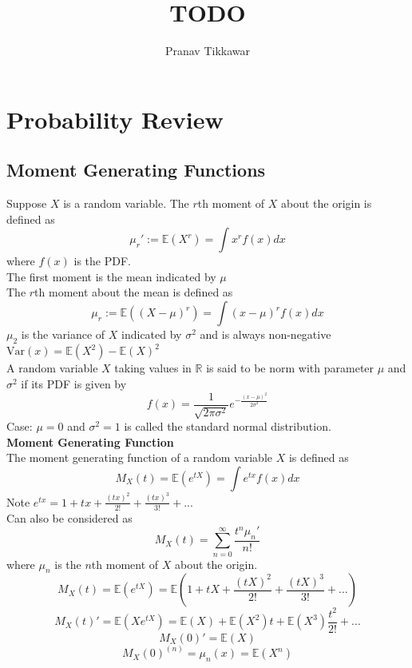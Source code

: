 \documentclass{article}
\author{Pranav Tikkawar}
\title{TODO}
\newcommand{\expec}[1]{\mathds{E}(#1)}
\newcommand{\var}[1]{\text{Var}(#1)}
\begin{document}
\maketitle

\section{Probability Review}
\subsection*{Moment Generating Functions}
Suppose $X$ is a random variable. The $r$th moment of $X$ about the origin is defined as
$$\mu_r' := \expec{X^r} = \int x^r f(x) dx$$
where $f(x)$ is the PDF. \\
The first moment is the mean indicated by $\mu$ \\
The $r$th moment about the mean is defined as
$$ \mu_r := \expec{(X - \mu)^r} = \int (x - \mu)^r f(x) dx$$
$\mu_2$ is the variance of $X$ indicated by $\sigma^2$ and is always non-negative \\
$\var{x} = \expec{X^2} - \expec{X}^2$ \\
A random variable $X$ taking values in $\mathds{R}$ is said to be norm with parameter $\mu$ and $\sigma^2$ if its PDF is given by
$$f(x) = \frac{1}{\sqrt{2\pi \sigma^2}} e^{-\frac{(x - \mu)^2}{2\sigma^2}}$$
Case: $\mu = 0$ and $\sigma^2 = 1$ is called the standard normal distribution. \\
\textbf{Moment Generating Function} \\
The moment generating function of a random variable $X$ is defined as 
$$M_X(t) = \expec{e^{tX}} = \int e^{tx} f(x)dx $$
Note $e^{tx} = 1 + tx + \frac{(tx)^2}{2!} + \frac{(tx)^3}{3!} + ...$ \\
Can also be considered as 
$$ M_X(t) = \sum_{n=0}^{\infty} \frac{t^n \mu_n'}{n!}$$
where $\mu_n$ is the $n$th moment of $X$ about the origin. \\
$$M_X(t) = \expec{e^{tX}} = \expec{1 + tX + \frac{(tX)^2}{2!} + \frac{(tX)^3}{3!} + ...}$$
$$M_X(t)' = \expec{Xe^{tX}} = \expec{X} + \expec{X^2}t + \expec{X^3}\frac{t^2}{2!} + ...$$
$$M_X(0)' = \expec{X} $$
$$M_X(0)^{(n)} = \mu_n(x) = \expec{X^n}$$





\end{document}
